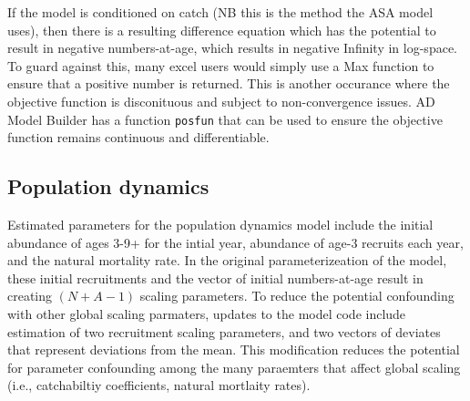 \documentclass[12pt,letterpaper]{article}
\begin{document}
  If the model is conditioned on catch (NB this is the method the ASA model uses), then there is a resulting difference equation which has the potential to result in negative numbers-at-age, which results in negative Infinity in log-space.  To guard against this, many excel users would simply use a Max function to ensure that a positive number is returned.  This is another occurance where the objective function is disconituous and subject to non-convergence issues.  AD Model Builder has a function \texttt{posfun} that can be used to ensure the objective function remains continuous and differentiable.


  \subsection{Population dynamics} %
  \label{sub:population_dynamics}
  Estimated parameters for the population dynamics model include the initial abundance of ages 3-9+ for the intial year, abundance of age-3 recruits each year, and the natural mortality rate. In the original parameterizeation of the model, these initial recruitments and the vector of initial numbers-at-age result in creating $(N + A-1)$ scaling parameters.  To reduce the potential confounding with other global scaling parmaters, updates to the model code include estimation of two recruitment scaling parameters, and two vectors of deviates that represent deviations from the mean. This modification reduces the potential for parameter confounding among the many paraemters that affect global scaling (i.e., catchabiltiy coefficients, natural mortlaity rates).

    
  

  
\end{document}
